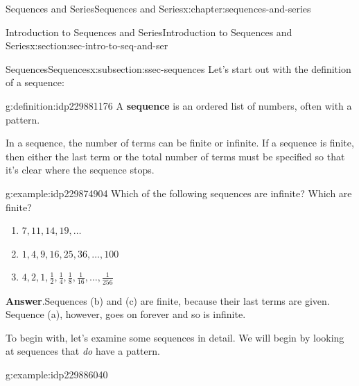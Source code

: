 \documentclass[twoside,10pt,]{book}
\newcommand{\blocktitlefont}{\relax}
\newcommand{\terminology}[1]{\textbf{#1}}
\numberwithin{equation}{section}
\begin{document}
%
%
\typeout{************************************************}
\typeout{************************************************}
%
\begin{chapterptx}{Sequences and Series}{}{Sequences and Series}{}{}{x:chapter:sequences-and-series}
%
%
\typeout{************************************************}
\typeout{************************************************}
%
\begin{sectionptx}{Introduction to Sequences and Series}{}{Introduction to Sequences and Series}{}{}{x:section:sec-intro-to-seq-and-ser}
%
%
\typeout{************************************************}
\typeout{************************************************}
%
\begin{subsectionptx}{Sequences}{}{Sequences}{}{}{x:subsection:ssec-sequences}
Let's start out with the definition of a sequence: \begin{definition}{}{g:definition:idp229881176}%
A \terminology{sequence} is an ordered list of numbers, often with a pattern.%
\end{definition}
 In a sequence, the number of terms can be finite or infinite.  If a sequence is finite, then either the last term or the total number of terms must be specified so that it's clear where the sequence stops. \begin{example}{}{g:example:idp229874904}%
Which of the following sequences are infinite?  Which are finite? %
\begin{enumerate}[label=(\alph*)]
\item{}\(\displaystyle 7,11,14,19,\ldots\)%
\item{}\(\displaystyle 1,4,9,16,25,36,\ldots,100\)%
\item{}\(\displaystyle 4,2,1,\tfrac{1}{2},\tfrac{1}{4},\tfrac{1}{8},\tfrac{1}{16},\ldots,\tfrac{1}{256}\)%
\end{enumerate}
\par\smallskip%
\noindent\textbf{\blocktitlefont Answer}.\label{g:answer:idp229884760}{}\hypertarget{g:answer:idp229884760}{}\quad{}Sequences (b) and (c) are finite, because their last terms are given.  Sequence (a), however, goes on forever and so is infinite.\end{example}
%
\par
To begin with, let's examine some sequences in detail.  We will begin by looking at sequences that \emph{do} have a pattern. \begin{example}{}{g:example:idp229886040}%

\end{example}
\end{subsectionptx}
\end{sectionptx}
\end{chapterptx}
\end{document}
